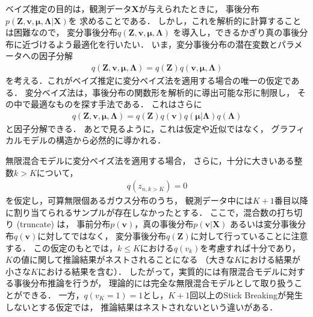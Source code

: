 ベイズ推定の目的は，観測データ$\bm{X}$が与えられたときに，
事後分布$p(\bm{Z},\bm{v},\bm\mu,\bm\Lambda|\bm{X})$を
求めることである．
しかし，これを解析的に計算することは困難なので，
変分事後分布$q(\bm{Z},\bm{v},\bm\mu,\bm\Lambda)$
を導入し，できるかぎり真の事後分布に近づけるよう最適化を行いたい．
いま，変分事後分布の潜在変数とパラメータへの因子分解
\begin{eqnarray}
 q(\bm{Z},\bm{v},\bm\mu,\bm\Lambda) 
  = q(\bm{Z}) q(\bm{v},\bm\mu,\bm\Lambda) 
 \label{eq:approx}
\end{eqnarray}
を考える．これがベイズ推定に変分ベイズ法を適用する場合の唯一の仮定である．
変分ベイズ法は，事後分布の関数形を解析的に導出可能な形に制限し，
その中で最適なものを探す手法である．
これはさらに
\begin{eqnarray}
q(\bm{Z},\bm{v},\bm\mu,\bm\Lambda) 
= q(\bm{Z}) q(\bm{v}) q(\bm\mu|\bm\Lambda) q(\bm\Lambda)
\end{eqnarray}
と因子分解できる．
あとで見るように，これは仮定や近似ではなく，
グラフィカルモデルの構造から必然的に導かれる．


無限混合モデルに変分ベイズ法を適用する場合，
さらに，十分に大きいある整数$k>K$について，
\begin{eqnarray}
 q(z_{n,k>K}) = 0
\end{eqnarray}
を仮定し，可算無限個あるガウス分布のうち，
観測データ中には$K+1$番目以降に割り当てられるサンプルが存在しなかったとする．
ここで，混合数の打ち切り (truncate) は，
事前分布$p(\bm{v})$，真の事後分布$p(\bm{v}|\bm{X})$
あるいは変分事後分布$q(\bm{v})$に対してではなく，
変分事後分布$q(\bm{Z})$に対して行っていることに注意する．
この仮定のもとでは，$k \le K$における$q(v_k)$を考慮すれば十分であり，
$K$の値に関して推論結果がネストされることになる
（大きな$K$における結果が小さな$K$における結果を含む）．
したがって，実質的には有限混合モデルに対する事後分布推論を行うが，
理論的には完全な無限混合モデルとして取り扱うことができる．
一方，$q(v_K=1) = 1$とし，$K+1$回以上のStick Breakingが発生しないとする仮定では，
推論結果はネストされないという違いがある．

